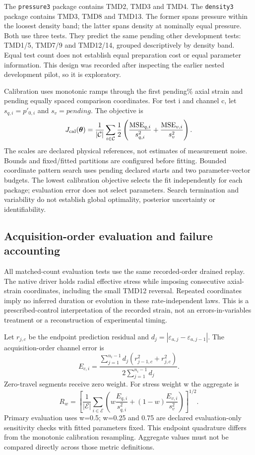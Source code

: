 \documentclass[11pt,a4paper]{article}
\newcommand{\PilotEvaluationTestCount}{pending}
\newcommand{\PilotMaximumStrainPercent}{pending}
\newcommand{\PilotCalibrationSamples}{pending}
\newcommand{\PilotVolumeScale}{pending}
\newcommand{\PilotStartCount}{pending}
\begin{document}
The \texttt{pressure3} package contains TMD2, TMD3 and TMD4. The \texttt{density3} package contains TMD3, TMD8 and TMD13. The former spans pressure within the loosest density band; the latter spans density at nominally equal pressure. Both use three tests. They predict the same \PilotEvaluationTestCount{} other development tests: TMD1/5, TMD7/9 and TMD12/14, grouped descriptively by density band. Equal test count does not establish equal preparation cost or equal parameter information. This design was recorded after inspecting the earlier nested development pilot, so it is exploratory.

Calibration uses monotonic ramps through the first \PilotMaximumStrainPercent\% axial strain and \PilotCalibrationSamples{} equally spaced comparison coordinates. For test i and channel c, let \(s_{q,i}=p'_{0,i}\) and \(s_v=\PilotVolumeScale\). The objective is
\[
J_{\rm cal}(\boldsymbol\theta)=\frac{1}{|\mathcal C|}\sum_{i\in\mathcal C}\frac12
\left(\frac{{\rm MSE}_{q,i}}{s_{q,i}^{2}}+
\frac{{\rm MSE}_{v,i}}{s_v^{2}}\right).
\]
The scales are declared physical references, not estimates of measurement noise. Bounds and fixed/fitted partitions are configured before fitting. Bounded coordinate pattern search uses \PilotStartCount{} declared starts and two parameter-vector budgets. The lowest calibration objective selects the fit independently for each package; evaluation error does not select parameters. Search termination and variability do not establish global optimality, posterior uncertainty or identifiability.

\subsection{Acquisition-order evaluation and failure accounting}
All matched-count evaluation tests use the same recorded-order drained replay. The native driver holds radial effective stress while imposing consecutive axial-strain coordinates, including the small TMD12 reversal. Repeated coordinates imply no inferred duration or evolution in these rate-independent laws. This is a prescribed-control interpretation of the recorded strain, not an errors-in-variables treatment or a reconstruction of experimental timing.

Let \(r_{j,c}\) be the endpoint prediction residual and
\(d_j=|\varepsilon_{a,j}-\varepsilon_{a,j-1}|\). The acquisition-order channel error is
\[
E_{c,i}=\frac{\sum_{j=1}^{n_i-1}d_j(r_{j-1,c}^{2}+r_{j,c}^{2})}
{2\sum_{j=1}^{n_i-1}d_j}.
\]
Zero-travel segments receive zero weight. For stress weight w the aggregate is
\[
R_w=\left[\frac{1}{|\mathcal E|}\sum_{i\in\mathcal E}
\left(w\frac{E_{q,i}}{s_{q,i}^{2}}+(1-w)\frac{E_{v,i}}{s_v^{2}}\right)\right]^{1/2}.
\]
Primary evaluation uses w=0.5; w=0.25 and 0.75 are declared evaluation-only sensitivity checks with fitted parameters fixed. This endpoint quadrature differs from the monotonic calibration resampling. Aggregate values must not be compared directly across those metric definitions.
\end{document}
